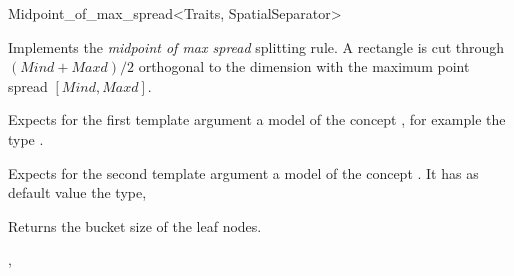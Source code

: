

\begin{ccRefFunctionObjectClass}{Midpoint_of_max_spread<Traits, SpatialSeparator>}


\ccDefinition
Implements the {\em midpoint of max spread} splitting rule.
A rectangle is cut through $(Mind+Maxd)/2$ orthogonal
to the dimension with the maximum point spread $[Mind,Maxd]$.


\ccParameters

Expects for the first template argument a model of
the concept , for example
the type . 

Expects for the second template argument a model of the concept . It has as default value
the type, 


\ccIsModel



\ccCreation
{}  %


\ccOperations
{} {Returns the bucket size of the leaf nodes.}

\ccSeeAlso

,\\

\end{ccRefFunctionObjectClass}


